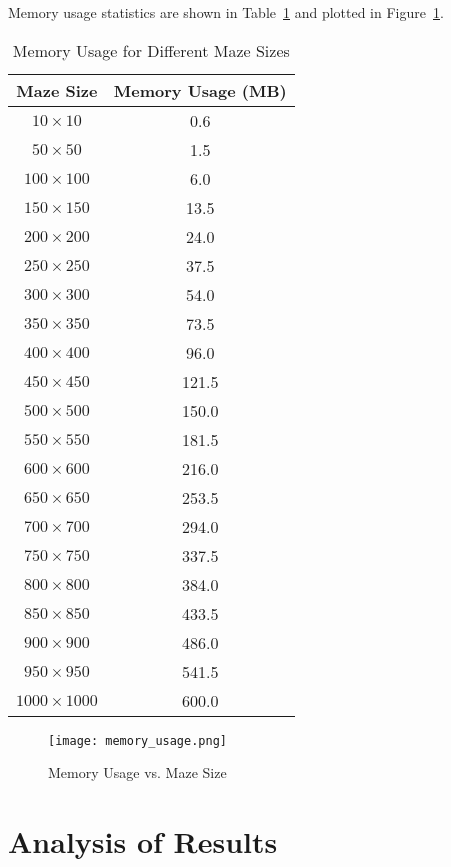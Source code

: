 \documentclass{article}
\begin{document}
Memory usage statistics are shown in Table~\ref{table:memory-usage} and plotted in Figure~\ref{fig:memory-usage}.

\begin{table}[H]
    \centering
    \begin{tabular}{|c|c|}
        \hline
        \textbf{Maze Size} & \textbf{Memory Usage (MB)} \\
        \hline
        $10 \times 10$ & 0.6 \\
        $50 \times 50$ & 1.5 \\
        $100 \times 100$ & 6.0 \\
        $150 \times 150$ & 13.5 \\
        $200 \times 200$ & 24.0 \\
        $250 \times 250$ & 37.5 \\
        $300 \times 300$ & 54.0 \\
        $350 \times 350$ & 73.5 \\
        $400 \times 400$ & 96.0 \\
        $450 \times 450$ & 121.5 \\
        $500 \times 500$ & 150.0 \\
        $550 \times 550$ & 181.5 \\
        $600 \times 600$ & 216.0 \\
        $650 \times 650$ & 253.5 \\
        $700 \times 700$ & 294.0 \\
        $750 \times 750$ & 337.5 \\
        $800 \times 800$ & 384.0 \\
        $850 \times 850$ & 433.5 \\
        $900 \times 900$ & 486.0 \\
        $950 \times 950$ & 541.5 \\
        $1000 \times 1000$ & 600.0 \\
        \hline
    \end{tabular}
    \caption{Memory Usage for Different Maze Sizes}
    \label{table:memory-usage}
\end{table}

\begin{figure}[H]
    \centering
    \texttt{[image: memory\_usage.png]}
    \caption{Memory Usage vs. Maze Size}
    \label{fig:memory-usage}
\end{figure}

\section*{Analysis of Results}
\end{document}

